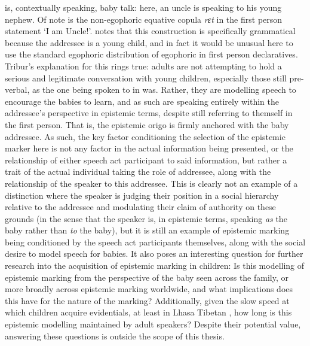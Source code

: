  is, contextually speaking, baby talk: here, an uncle is speaking to his young nephew. Of note is the non-egophoric equative copula \textit{rɛt} in the first person statement `I am Uncle!'.  notes that this construction is specifically grammatical because the addressee is a young child, and in fact it would be unusual here to use the standard egophoric distribution of egophoric in first person declaratives. Tribur's explanation for this rings true: adults are not attempting to hold a serious and legitimate conversation with young children, especially those still pre-verbal, as the one being spoken to in  was. Rather, they are modelling speech to encourage the babies to learn, and as such are speaking entirely within the addressee's perspective in epistemic terms, despite still referring to themself in the first person. That is, the epistemic origo is firmly anchored with the baby addressee. As such, the key factor conditioning the selection of the epistemic marker here is not any factor in the actual information being presented, or the relationship of either speech act participant to said information, but rather a trait of the actual individual taking the role of addressee, along with the relationship of the speaker to this addressee. This is clearly not an example of a distinction where the speaker is judging their position in a social hierarchy relative to the addressee and modulating their claim of authority on these grounds (in the sense that the speaker is, in epistemic terms, speaking \textit{as} the baby rather than \textit{to} the baby), but it is still an example of epistemic marking being conditioned by the speech act participants themselves, along with the social desire to model speech for babies. It also poses an interesting question for further research into the acquisition of epistemic marking in children: Is this modelling of epistemic marking from the perspective of the baby seen across the family, or more broadly across epistemic marking worldwide, and what implications does this have for the nature of the marking? Additionally, given the slow speed at which children acquire evidentials, at least in Lhasa Tibetan \cites{DeVilliers2009}{GarfieldDeVilliers2017}, how long is this epistemic modelling maintained by adult speakers? Despite their potential value, answering these questions is outside the scope of this thesis.

